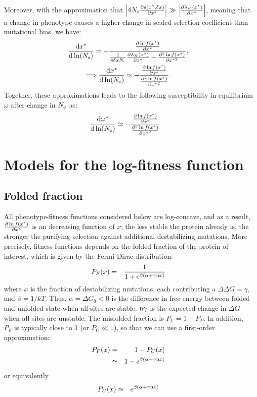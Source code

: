\documentclass{article}
\begin{document}
Moreover, with the approximation that $\left| 4 N_{\mathrm{e}} \frac{ \partial s(x^{*}, \delta x) }{\partial x^{*} } \right| \gg \left| \frac{\partial \lambda_K (x^{*}) }{\partial x^{*} } \right|$, meaning that a change in phenotype causes a higher change in scaled selection coefficient than mutational bias, we have:
\begin{gather}
\frac{ \mathrm{d} x^{*}}{\mathrm{d} \ln (N_{\mathrm{e}})}  = - \frac{\frac{ \partial \ln f(x^{*}) }{\partial {x^{*}}}}{\frac{1}{4 \delta x N_{\mathrm{e}}} \frac{\partial \lambda_K (x^{*}) }{\partial x^{*} } + \frac{ \partial^2 \ln f(x^{*}) }{\partial {x^{*}}^2}},\\
\Longrightarrow \frac{ \mathrm{d} x^{*}}{\mathrm{d} \ln (N_{\mathrm{e}})}  \simeq - \frac{\frac{ \partial \ln f(x^{*}) }{\partial {x^{*}}}}{\frac{ \partial^2 \ln f(x^{*}) }{\partial {x^{*}}^2}}. \label{eq:approx_dx_dlnNe}
\end{gather}
Together, these approximations leads to the following susceptibility in equilibrium $\omega$ after change in $N_{\mathrm{e}}$ as:
\begin{align}
\frac{ \mathrm{d} \omega^{*}}{\mathrm{d} \ln (N_{\mathrm{e}})} & \simeq - \frac{\frac{ \partial \ln f(x^{*}) }{\partial {x^{*}}}}{\frac{ \partial^2 \ln f(x^{*}) }{\partial {x^{*}}^2}}\label{eq:approx_dw_dlnNe}
\end{align}
\section{Models for the log-fitness function}
\subsection{Folded fraction}
All phenotype-fitness functions considered below are log-concave, and as a result, $\frac{ \partial \ln f(x^{*}) }{\partial {x^{*}}}$ is an decreasing function of $x$; the less stable the protein already is, the stronger the purifying selection against additional destabilizing mutations. More precisely, fitness functions depends on the folded fraction of the protein of interest, which is given by the Fermi-Dirac distribution:
\begin{eqnarray}
P_{F} (x) &=& \frac{1}{1 + e^{\beta(\alpha + \gamma \text{n} x)}}
\end{eqnarray}
where $x$ is the fraction of destabilizing mutations, each contributing a $\Delta \Delta G = \gamma$, and $\beta = 1 / kT$. Thus, $\alpha = \Delta G_0 < 0$ is the difference in free energy between folded and unfolded state when all sites are stable. $\text{n} \gamma$ is the expected change in $\Delta G$ when all sites are unstable. The misfolded fraction is  $P_{U} = 1-P_{F}$. In addition, $P_{F}$ is typically close to 1 (or $P_{U} \ll 1$), so that we can use a first-order approximation:
\begin{eqnarray}
P_{F}(x) &=& 1 - P_{U}(x) \\
&\simeq& 1 - e^{\beta(\alpha + \gamma \text{n} x)}
\end{eqnarray}
or equivalently
\begin{eqnarray}
P_{U}(x) &\simeq& e^{\beta(\alpha + \gamma \text{n} x)}
\end{eqnarray}
\end{document}
